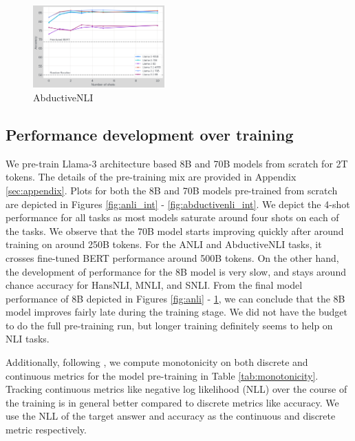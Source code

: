 \begin{figure}[t]
    \centering
    \includegraphics[width=0.45\textwidth]{nli_plots/abductivenli.png}
    \caption{AbductiveNLI}
    \label{fig:abductivenli}
\end{figure}

\subsection{Performance development over training}

We pre-train Llama-3 architecture based 8B and 70B models from scratch for 2T tokens. The details of the pre-training mix are provided in Appendix \ref{sec:appendix}. Plots for both the 8B and 70B models pre-trained from scratch are depicted in Figures \ref{fig:anli_int} - \ref{fig:abductivenli_int}. We depict the 4-shot performance for all tasks as most models saturate around four shots on each of the tasks. We observe that the 70B model starts improving quickly after around training on around 250B tokens. For the ANLI and AbductiveNLI tasks, it crosses fine-tuned BERT performance around 500B tokens. On the other hand, the development of performance for the 8B model is very slow, and stays around chance accuracy for HansNLI, MNLI, and SNLI. From the final model performance of 8B depicted in Figures \ref{fig:anli} - \ref{fig:abductivenli}, we can conclude that the 8B model improves fairly late during the training stage. We did not have the budget to do the full pre-training run, but longer training definitely seems to help on NLI tasks.

Additionally, following \citet{variancepaper}, we compute monotonicity on both discrete and continuous metrics for the model pre-training in Table \ref{tab:monotonicity}. Tracking continuous metrics like negative log likelihood (NLL) over the course of the training is in general better compared to discrete metrics like accuracy. We use the NLL of the target answer and accuracy as the continuous and discrete metric respectively.

